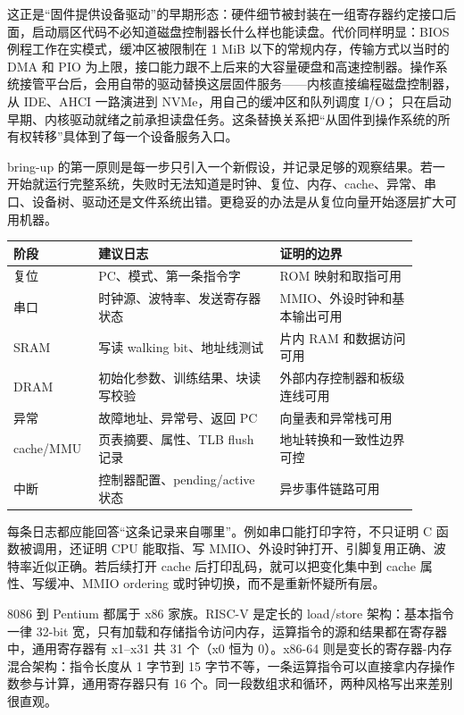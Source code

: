 这正是“固件提供设备驱动”的早期形态：硬件细节被封装在一组寄存器约定接口后面，启动扇区代码不必知道磁盘控制器长什么样也能读盘。代价同样明显：BIOS 例程工作在实模式，缓冲区被限制在 1 MiB 以下的常规内存，传输方式以当时的 DMA 和 PIO 为上限，接口能力跟不上后来的大容量硬盘和高速控制器。操作系统接管平台后，会用自带的驱动替换这层固件服务——内核直接编程磁盘控制器，从 IDE、AHCI 一路演进到 NVMe，用自己的缓冲区和队列调度 I/O； 只在启动早期、内核驱动就绪之前承担读盘任务。这条替换关系把“从固件到操作系统的所有权转移”具体到了每一个设备服务入口。

bring-up 的第一原则是每一步只引入一个新假设，并记录足够的观察结果。若一开始就运行完整系统，失败时无法知道是时钟、复位、内存、cache、异常、串口、设备树、驱动还是文件系统出错。更稳妥的办法是从复位向量开始逐层扩大可用机器。

\begin{longtable}{L{0.16\linewidth}L{0.42\linewidth}L{0.32\linewidth}}
\toprule
阶段 & 建议日志 & 证明的边界 \\
\midrule
复位 & PC、模式、第一条指令字 & ROM 映射和取指可用 \\
串口 & 时钟源、波特率、发送寄存器状态 & MMIO、外设时钟和基本输出可用 \\
SRAM & 写读 walking bit、地址线测试 & 片内 RAM 和数据访问可用 \\
DRAM & 初始化参数、训练结果、块读写校验 & 外部内存控制器和板级连线可用 \\
异常 & 故障地址、异常号、返回 PC & 向量表和异常栈可用 \\
cache/MMU & 页表摘要、属性、TLB flush 记录 & 地址转换和一致性边界可控 \\
中断 & 控制器配置、pending/active 状态 & 异步事件链路可用 \\
\bottomrule
\end{longtable}

每条日志都应能回答“这条记录来自哪里”。例如串口能打印字符，不只证明 C 函数被调用，还证明 CPU 能取指、写 MMIO、外设时钟打开、引脚复用正确、波特率近似正确。若后续打开 cache 后打印乱码，就可以把变化集中到 cache 属性、写缓冲、MMIO ordering 或时钟切换，而不是重新怀疑所有层。

8086 到 Pentium 都属于 x86 家族。RISC-V 是定长的 load/store 架构：基本指令一律 32-bit 宽，只有加载和存储指令访问内存，运算指令的源和结果都在寄存器中，通用寄存器有 x1--x31 共 31 个（x0 恒为 0）。x86-64 则是变长的寄存器-内存混合架构：指令长度从 1 字节到 15 字节不等，一条运算指令可以直接拿内存操作数参与计算，通用寄存器只有 16 个。同一段数组求和循环，两种风格写出来差别很直观。

